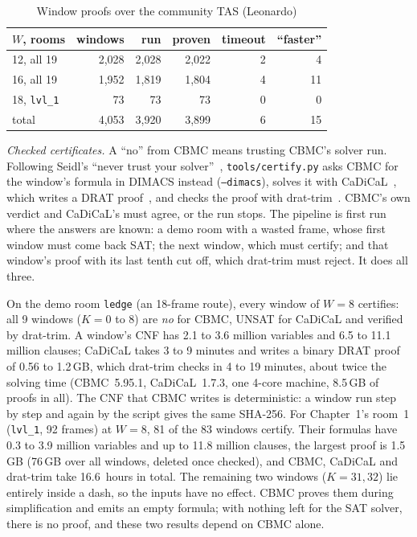 \documentclass[conference]{IEEEtran}
\newcommand{\code}[1]{\texttt{#1}}
\newcommand{\LEDGEROWS}{all 9 windows ($K = 0$ to 8) are \emph{no} for CBMC, UNSAT for CaDiCaL and verified by drat-trim}
\newcommand{\LEDGECHECK}{4 to 19 minutes}
\begin{document}
\begin{table}[t]
\centering
\caption{Window proofs over the community TAS (Leonardo)}
\label{tab:leonardo}
\begin{tabular}{@{}lrrrrr@{}}
\toprule
$W$, rooms & windows & run & proven & timeout & ``faster'' \\
\midrule
12, all 19 & 2,028 & 2,028 & 2,022 & 2 & 4 \\
16, all 19 & 1,952 & 1,819 & 1,804 & 4 & 11 \\
18, \code{lvl\_1} & 73 & 73 & 73 & 0 & 0 \\
\midrule
total & 4,053 & 3,920 & 3,899 & 6 & 15 \\
\bottomrule
\end{tabular}
\end{table}

\emph{Checked certificates.} A ``no'' from CBMC means trusting CBMC's
solver run. Following Seidl's ``never trust your solver''~\cite{seidl}, \code{tools/certify.py}
asks CBMC for the window's formula in DIMACS instead (\code{--dimacs}), solves
it with CaDiCaL~\cite{cadical}, which writes a DRAT proof~\cite{drat}, and
checks the proof with drat-trim~\cite{drattrim}. CBMC's own verdict and
CaDiCaL's must agree, or the run stops. The pipeline is first run where the
answers are known: a demo room with a wasted frame, whose first window must
come back SAT; the next window, which must certify; and that window's proof
with its last tenth cut off, which drat-trim must reject. It does all three.

On the demo room \code{ledge} (an 18-frame route), every window of
$W{=}8$ certifies: \LEDGEROWS. A window's CNF has 2.1 to 3.6 million
variables and 6.5 to 11.1 million clauses; CaDiCaL takes 3 to 9 minutes and
writes a binary DRAT proof of 0.56 to 1.2\,GB, which drat-trim checks in
\LEDGECHECK, about twice the solving time (CBMC~5.95.1, CaDiCaL~1.7.3, one
4-core machine, 8.5\,GB of proofs in all). The CNF that CBMC writes is
deterministic: a window run step by step and again by the script gives the
same SHA-256.
For Chapter~1's room~1 (\code{lvl\_1}, 92 frames) at $W{=}8$, 81 of the 83
windows certify. Their formulas have 0.3 to 3.9 million variables and up to
11.8 million clauses, the largest proof is 1.5\,GB (76\,GB over all windows,
deleted once checked), and CBMC, CaDiCaL and drat-trim take 16.6~hours in
total. The remaining two windows ($K = 31, 32$) lie entirely inside a dash,
so the inputs have no effect. CBMC proves them during simplification and
emits an empty formula; with nothing left for the SAT solver, there is no
proof, and these two results depend on CBMC alone.
\end{document}
